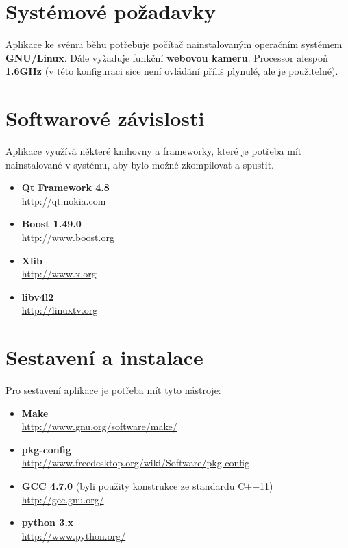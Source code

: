 \newpage

\section{Systémové požadavky}
Aplikace ke svému běhu potřebuje počítač nainstalovaným operačním systémem
\textbf{GNU/Linux}. Dále vyžaduje funkční \textbf{webovou kameru}. Processor
alespoň \textbf{1.6GHz} (v této konfiguraci sice není ovládání příliš plynulé,
ale je použitelné).

\section{Softwarové závislosti}
Aplikace využívá některé knihovny a frameworky, které je potřeba mít
nainstalované v systému, aby bylo možné zkompilovat a spustit.

\begin{itemize}
    \item \textbf{Qt Framework 4.8}\\
    \url{http://qt.nokia.com}
    \item \textbf{Boost 1.49.0}\\
    \url{http://www.boost.org}
    \item \textbf{Xlib} \\
    \url{http://www.x.org}
    \item \textbf{libv4l2} \\
    \url{http://linuxtv.org}
\end{itemize}

\section{Sestavení a instalace}
Pro sestavení aplikace je potřeba mít tyto nástroje:

\begin{itemize}
    \item \textbf{Make} \\
    \url{http://www.gnu.org/software/make/}
    \item \textbf{pkg-config} \\
    \url{http://www.freedesktop.org/wiki/Software/pkg-config}
    \item \textbf{GCC 4.7.0} (byli použity konstrukce ze standardu C++11) \\
    \url{http://gcc.gnu.org/}
    \item \textbf{python 3.x} \\
    \url{http://www.python.org/}
\end{itemize}


